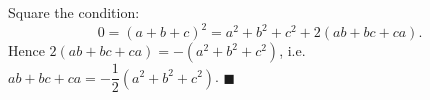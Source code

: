 Square the condition:
\[
0=(a+b+c)^2=a^2+b^2+c^2+2(ab+bc+ca).
\]
Hence $2(ab+bc+ca)=-(a^2+b^2+c^2)$, i.e.\ $ab+bc+ca=-\dfrac{1}{2}\left(a^2+b^2+c^2\right)$. $\blacksquare$
